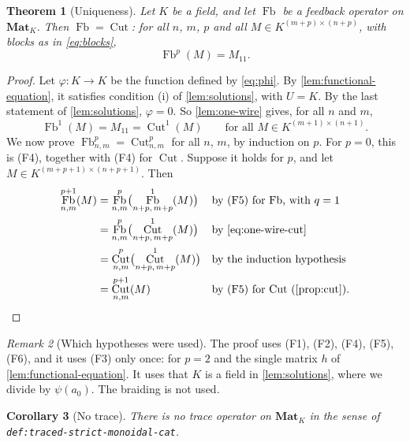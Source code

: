 \documentclass[11pt,a4paper]{article}
\theoremstyle{plain}
\newtheorem{theorem}{Theorem}
\newtheorem{corollary}[theorem]{Corollary}
\theoremstyle{definition}
\theoremstyle{remark}
\newtheorem{remark}[theorem]{Remark}
\DeclareMathOperator{\Fb}{Fb}
\DeclareMathOperator{\Cut}{Cut}
\newcommand{\Mat}{\mathbf{Mat}}
\newcommand{\lbl}[1]{\nolinkurl{#1}}
\begin{document}
\begin{theorem}[Uniqueness]
    \label{thm:unique}
    Let $K$ be a field, and let $\Fb$ be a feedback operator on $\Mat_K$.
    Then $\Fb = \Cut$: for all $n$, $m$, $p$ and all $M \in K^{(m+p) \times (n+p)}$, with blocks as in \cref{eq:blocks},
    \begin{equation}
        \Fb^p(M) = M_{11} .
    \end{equation}
\end{theorem}

\begin{proof}
    Let $\varphi \colon K \to K$ be the function defined by \cref{eq:phi}.
    By \cref{lem:functional-equation}, it satisfies condition (i) of \cref{lem:solutions}, with $U = K$.
    By the last statement of \cref{lem:solutions}, $\varphi = 0$.
    So \cref{lem:one-wire} gives, for all $n$ and $m$,
    \begin{equation}
        \label{eq:one-wire-cut}
        \Fb^1(M) = M_{11} = \Cut^1(M) \qquad \text{for all } M \in K^{(m+1) \times (n+1)} .
    \end{equation}
    We now prove $\Fb^p_{n,m} = \Cut^p_{n,m}$ for all $n$, $m$, by induction on $p$.
    For $p = 0$, this is (F4), together with (F4) for $\Cut$.
    Suppose it holds for $p$, and let $M \in K^{(m+p+1) \times (n+p+1)}$.
    Then
    \begin{align*}
        \Fb^{p+1}_{n,m}(M)
         & = \Fb^p_{n,m}\bigl( \Fb^1_{n+p,\,m+p}(M) \bigr)   &  & \text{by (F5) for $\Fb$, with $q = 1$} \\
         & = \Fb^p_{n,m}\bigl( \Cut^1_{n+p,\,m+p}(M) \bigr)  &  & \text{by \cref{eq:one-wire-cut}} \\
         & = \Cut^p_{n,m}\bigl( \Cut^1_{n+p,\,m+p}(M) \bigr) &  & \text{by the induction hypothesis} \\
         & = \Cut^{p+1}_{n,m}(M)                             &  & \text{by (F5) for $\Cut$ (\cref{prop:cut}).}
    \end{align*}
\end{proof}

\begin{remark}[Which hypotheses were used]
    The proof uses (F1), (F2), (F4), (F5), (F6), and it uses (F3) only once: for $p = 2$ and the single matrix $h$ of \cref{lem:functional-equation}.
    It uses that $K$ is a field in \cref{lem:solutions}, where we divide by $\psi(a_0)$.
    The braiding is not used.
\end{remark}

\begin{corollary}[No trace]
    \label{cor:no-trace}
    There is no trace operator on $\Mat_K$ in the sense of \lbl{def:traced-strict-monoidal-cat}.
\end{corollary}
\end{document}
